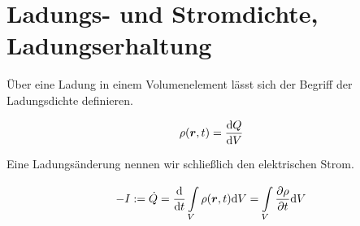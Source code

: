 \section{Ladungs- und Stromdichte, Ladungserhaltung}

Über eine Ladung in einem Volumenelement lässt sich der Begriff der Ladungsdichte definieren.

\begin{equation*}
\rho(\bm{r},t)=\frac{\mathrm{d}{Q}}{\mathrm{d}{V}}
\end{equation*}

Eine Ladungsänderung nennen wir schließlich den elektrischen Strom.

\begin{equation*}
-I:=\dot{Q}=\frac{\mathrm{d}{}}{\mathrm{d}{t}}\int\limits_{V}^{} \rho(\bm{r},t) \mathrm{d} V=\int\limits_{V}^{} \frac{\partial{\rho}}{\partial{t}} \mathrm{d} V
\end{equation*}		